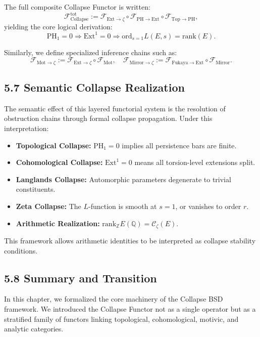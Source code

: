 \documentclass[11pt]{article}
\begin{document}
The full composite Collapse Functor is written:
\[
\mathcal{F}^{\mathrm{tot}}_{\mathrm{Collapse}} := \mathcal{F}_{\mathrm{Ext} \to \zeta} \circ \mathcal{F}_{\mathrm{PH} \to \mathrm{Ext}} \circ \mathcal{F}_{\mathrm{Top} \to \mathrm{PH}},
\]
yielding the core logical derivation:
\[
\mathrm{PH}_1 = 0 \Rightarrow \mathrm{Ext}^1 = 0 \Rightarrow \mathrm{ord}_{s=1} L(E,s) = \mathrm{rank}(E).
\]

Similarly, we define specialized inference chains such as:
\[
\mathcal{F}_{\mathrm{Mot} \to \zeta} := \mathcal{F}_{\mathrm{Ext} \to \zeta} \circ \mathcal{F}_{\mathrm{Mot}},
\quad
\mathcal{F}_{\mathrm{Mirror} \to \zeta} := \mathcal{F}_{\mathrm{Fukaya} \to \mathrm{Ext}} \circ \mathcal{F}_{\mathrm{Mirror}}.
\]

\subsection{5.7 Semantic Collapse Realization}

The semantic effect of this layered functorial system is the resolution of obstruction chains through formal collapse propagation. Under this interpretation:

\begin{itemize}
  \item \textbf{Topological Collapse:} $\mathrm{PH}_1 = 0$ implies all persistence bars are finite.
  \item \textbf{Cohomological Collapse:} $\mathrm{Ext}^1 = 0$ means all torsion-level extensions split.
  \item \textbf{Langlands Collapse:} Automorphic parameters degenerate to trivial constituents.
  \item \textbf{Zeta Collapse:} The $L$-function is smooth at $s = 1$, or vanishes to order $r$.
  \item \textbf{Arithmetic Realization:} $\mathrm{rank}_{\mathbb{Z}} E(\mathbb{Q}) = \mathcal{C}_{\zeta}(E)$.
\end{itemize}

This framework allows arithmetic identities to be interpreted as collapse stability conditions.

\subsection{5.8 Summary and Transition}

In this chapter, we formalized the core machinery of the Collapse BSD framework.  
We introduced the Collapse Functor not as a single operator but as a stratified family of functors linking topological, cohomological, motivic, and analytic categories.
\end{document}
